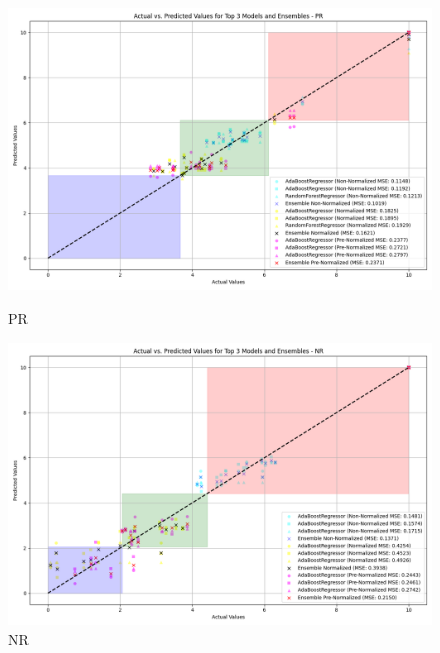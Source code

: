 \begin{figure}[H]
    \centering
    \begin{minipage}{0.45\textwidth}
        \centering
        \includegraphics[width=\linewidth]{reg_section_specific/ensemble_learning/actual_vs_predicted_top_3_models_and_ensembles_PR.png}
        \caption{PR}
        \label{reg_spec_fig:pr_ensemble}
    \end{minipage}\hfill
    \begin{minipage}{0.45\textwidth}
        \centering
        \includegraphics[width=\linewidth]{reg_section_specific/ensemble_learning/actual_vs_predicted_top_3_models_and_ensembles_NR.png}
        \caption{NR}
        \label{reg_spec_fig:nr_ensemble}
    \end{minipage}
\end{figure}


